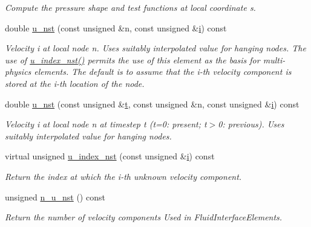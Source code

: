\begin{DoxyCompactItemize}
\begin{DoxyCompactList}\small\item\em Compute the pressure shape and test functions at local coordinate s. \end{DoxyCompactList}\item 
double \hyperlink{classoomph_1_1GeneralisedNewtonianNavierStokesEquations_a5c069c40584270d7b7b3522fbab33fd0}{u\+\_\+nst} (const unsigned \&n, const unsigned \&\hyperlink{cfortran_8h_adb50e893b86b3e55e751a42eab3cba82}{i}) const
\begin{DoxyCompactList}\small\item\em Velocity i at local node n. Uses suitably interpolated value for hanging nodes. The use of \hyperlink{classoomph_1_1GeneralisedNewtonianNavierStokesEquations_a3d3e311b51c9258280c0f65d55581a3e}{u\+\_\+index\+\_\+nst()} permits the use of this element as the basis for multi-\/physics elements. The default is to assume that the i-\/th velocity component is stored at the i-\/th location of the node. \end{DoxyCompactList}\item 
double \hyperlink{classoomph_1_1GeneralisedNewtonianNavierStokesEquations_ab025c2ddf55b0c4901eb070077ee2a3a}{u\+\_\+nst} (const unsigned \&\hyperlink{cfortran_8h_af6f0bd3dc13317f895c91323c25c2b8f}{t}, const unsigned \&n, const unsigned \&\hyperlink{cfortran_8h_adb50e893b86b3e55e751a42eab3cba82}{i}) const
\begin{DoxyCompactList}\small\item\em Velocity i at local node n at timestep t (t=0\+: present; t$>$0\+: previous). Uses suitably interpolated value for hanging nodes. \end{DoxyCompactList}\item 
virtual unsigned \hyperlink{classoomph_1_1GeneralisedNewtonianNavierStokesEquations_a3d3e311b51c9258280c0f65d55581a3e}{u\+\_\+index\+\_\+nst} (const unsigned \&\hyperlink{cfortran_8h_adb50e893b86b3e55e751a42eab3cba82}{i}) const
\begin{DoxyCompactList}\small\item\em Return the index at which the i-\/th unknown velocity component. \end{DoxyCompactList}\item 
unsigned \hyperlink{classoomph_1_1GeneralisedNewtonianNavierStokesEquations_a11f3a8c7d6fb7b9d1b915241c0ad1884}{n\+\_\+u\+\_\+nst} () const
\begin{DoxyCompactList}\small\item\em Return the number of velocity components Used in Fluid\+Interface\+Elements. \end{DoxyCompactList}\item 

\end{DoxyCompactItemize}

